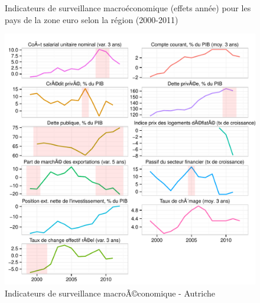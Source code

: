 \documentclass{article}\usepackage[]{graphicx}\usepackage[]{color}
\makeatletter
\def\maxwidth{ %
  \ifdim\Gin@nat@width>\linewidth
    \linewidth
  \else
    \Gin@nat@width
  \fi
}
\newenvironment{knitrout}{}{} %
\makeatother
\begin{document}
\begin{knitrout}
\begin{figure}[p]
{}

\caption[Indicateurs de surveillance macroéconomique (effets année) pour les pays de la zone euro selon la région (2000-2011)]{Indicateurs de surveillance macroéconomique (effets année) pour les pays de la zone euro selon la région (2000-2011)\label{fig:panel2}}
\end{figure}


\end{knitrout}

\clearpage

\begin{knitrout}
\color{fgcolor}\begin{figure}[p]


{\centering \includegraphics[width=\maxwidth]{figure_graph/byco1} 

}

\caption[Indicateurs de surveillance macroÃ©conomique - Autriche]{Indicateurs de surveillance macroÃ©conomique - Autriche\label{fig:byco1}}
\end{figure}

\begin{figure}[p]



\end{figure}
\end{knitrout}
\end{document}
